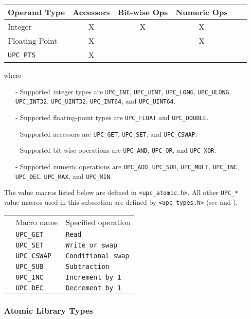 \begin{center}
\begin{tabular}{l|ccccc}
Operand Type   & Accessors & Bit-wise Ops & Numeric Ops \\ \hline
Integer        &  X        &  X           &  X          \\
Floating Point &  X        &              &  X          \\
{\tt UPC\_PTS} &  X        &              &             \\
\end{tabular}
\end{center}

    where
\begin{itemize}
  \item[-] Supported integer types are {\tt UPC\_INT}, {\tt UPC\_UINT},
    {\tt UPC\_LONG}, {\tt UPC\_ULONG}, {\tt UPC\_INT32}, {\tt UPC\_UINT32},
    {\tt UPC\_INT64}, and {\tt UPC\_UINT64}.
  \item[-] Supported floating-point types are {\tt UPC\_FLOAT} and
    {\tt UPC\_DOUBLE}.
  \item[-] Supported accessors are {\tt UPC\_GET}, {\tt UPC\_SET}, and
    {\tt UPC\_CSWAP}.
  \item[-] Supported bit-wise operations are {\tt UPC\_AND}, {\tt UPC\_OR},
    and {\tt UPC\_XOR}.
  \item[-] Supported numeric operations are
    {\tt UPC\_ADD}, {\tt UPC\_SUB}, {\tt UPC\_MULT}, 
    {\tt UPC\_INC}, {\tt UPC\_DEC}, 
    {\tt UPC\_MAX}, and {\tt UPC\_MIN}.
\end{itemize}

\np The value macros listed below are defined in {\tt <upc\_atomic.h>}.  
    All other {\tt UPC\_*} value macros used
    in this subsection are defined by {\tt <upc\_types.h>} (see
    \upcopsection{} and \upctypesection{}).

\newcommand\defmacrotab[2]{ & {\tt UPC\_#1}\index{UPC\_#1} & {\tt #2}\\}
\begin{tabular}{ p{30pt} l l }
& Macro name & Specified operation\\
\cline{2-3}
\defmacrotab{GET}       {Read}
\defmacrotab{SET}       {Write or swap}
\defmacrotab{CSWAP}     {Conditional swap}
\defmacrotab{SUB}       {Subtraction}
\defmacrotab{INC}       {Increment by 1}
\defmacrotab{DEC}       {Decrement by 1}
\end{tabular}

\subsubsection{Atomic Library Types}
\label{upc-atomic-types}

